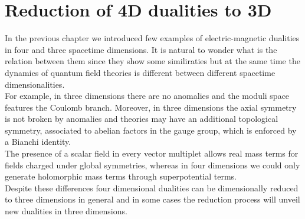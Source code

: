 
\chapter{Reduction of 4D dualities to 3D}

% 


In the previous chapter we introduced few examples of electric-magnetic dualities in four and three spacetime dimensions.
It is natural to wonder what is the relation between them since they show some similiraties but at the same time the dynamics of quantum field theories is different between different spacetime dimensionalities.\\
For example, in three dimensions there are no anomalies and the moduli space features the Coulomb branch. 
Moreover, in three dimensions the axial symmetry is not broken by anomalies and theories may have an additional topological symmetry, associated to abelian factors in the gauge group,  which is enforced by a Bianchi identity.\\
The presence of a scalar field in every vector multiplet allows real mass terms for fields charged under global symmetries, whereas in four dimensions we could only generate holomorphic mass terms through superpotential terms.\\
Despite these differences four dimensional dualities can be dimensionally reduced to three dimensions in general and in some cases the reduction process will unveil new dualities in three dimensions.
\\

